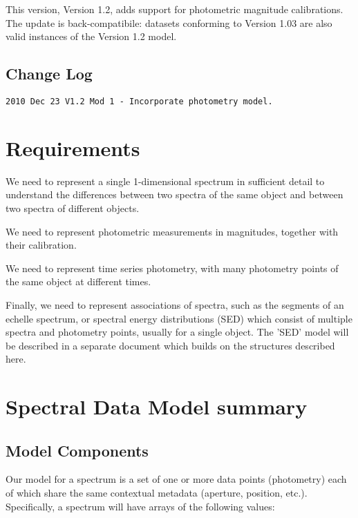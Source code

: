 \documentclass[11pt]{article}
\newcommand{\new}{\color{red}}
\begin{document}
{\new This version, Version 1.2, adds support for photometric magnitude calibrations.
The update is back-compatibile: datasets conforming to Version 1.03 are also valid instances of the Version 1.2 model.}

\subsection{Change Log}

\begin{verbatim}
2010 Dec 23 V1.2 Mod 1 - Incorporate photometry model.
\end{verbatim}

\clearpage

\section{Requirements}

We need to represent a single 1-dimensional spectrum in sufficient
detail to understand the differences between two spectra of the same
object and between two spectra of different objects.

{\new We need to represent photometric measurements in magnitudes, together
with their calibration.}

We need to represent time series photometry, with many photometry points
of the same object at different times.

Finally, we need to represent associations of spectra,
such as the segments of an echelle spectrum, or
spectral energy distributions (SED) which
consist of multiple spectra and photometry points, usually for a single
object. The 'SED' model will be described in
a separate document which builds on the structures described here.

\section{Spectral Data Model summary}

\subsection{Model Components}

Our model for a spectrum is a set of one or more data points (photometry)  each of
which share the same contextual metadata  (aperture, position,
etc.). Specifically, a spectrum
will have arrays of the following values:

\vskip 0.1in
\end{document}
